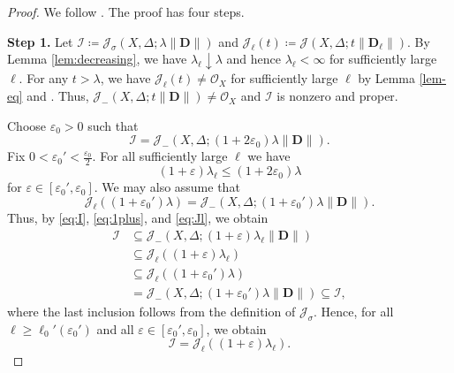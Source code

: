 \documentclass[a4paper,12pt]{amsart}
\theoremstyle{plain}
\theoremstyle{definition}
\numberwithin{equation}{section}
\newcommand{\OO}{\mathcal{O}}
\begin{document}
\begin{proof}
We follow \cite[Proof of Proposition 3.15]{CJKL}. The proof has four steps.

\noindent \textbf{Step 1.} Let $\mathcal{I}\coloneqq \mathcal{J}_{\sigma}(X,\Delta;\lambda\|\mathbf{D}\|)$ and $\mathcal{J}_{\ell}(t)\coloneqq \mathcal{J}(X,\Delta;t\|\mathbf{D}_{\ell}\|)$. By Lemma \ref{lem:decreasing}, we have $\lambda_{\ell}\downarrow \lambda$ and hence $\lambda_{\ell}<\infty$ for sufficiently large $\ell$. For any $t>\lambda$, we have $\mathcal{J}_{\ell}(t)\neq \OO_X$ for sufficiently large $\ell$ by Lemma \ref{lem-eq} and \cite[Theorem 3.7]{CJKL}. Thus, $\mathcal{J}_{-}(X,\Delta;t\|\mathbf{D}\|)\neq \OO_X$ and $\mathcal{I}$ is nonzero and proper.

Choose $\varepsilon_0>0$ such that
\begin{equation}\label{eq:I}
    \mathcal{I}=\mathcal{J}_{-}(X,\Delta;(1+2\varepsilon_0)\lambda\|\mathbf{D}\|).
\end{equation}
Fix $0<\varepsilon_0'<\frac{\varepsilon_0}{2}$. For all sufficiently large $\ell$ we have
\begin{equation}\label{eq:1plus}
    (1+\varepsilon)\lambda_{\ell}\leq (1+2\varepsilon_0)\lambda
\end{equation}
for $\varepsilon\in [\varepsilon_0',\varepsilon_0]$. 
We may also assume that
\begin{equation}\label{eq:Jl}
    \mathcal{J}_{\ell}((1+\varepsilon_0')\lambda)=\mathcal{J}_{-}(X,\Delta;(1+\varepsilon_0')\lambda\|\mathbf{D}\|).
\end{equation}
Thus, by \eqref{eq:I}, \eqref{eq:1plus}, and \eqref{eq:Jl}, we obtain
\begin{align*}
    \mathcal{I}&\subseteq \mathcal{J}_{-}(X,\Delta;(1+\varepsilon)\lambda_{\ell}\|\mathbf{D}\|)\\
    &\subseteq \mathcal{J}_{\ell}((1+\varepsilon)\lambda_{\ell})\\
    &\subseteq \mathcal{J}_{\ell}((1+\varepsilon_0')\lambda)\\
    &=\mathcal{J}_{-}(X,\Delta;(1+\varepsilon_0')\lambda\|\mathbf{D}\|)\subseteq \mathcal{I},
\end{align*}
where the last inclusion follows from the definition of $\mathcal{J}_{\sigma}$. Hence, for all $\ell\geq \ell_0'(\varepsilon_0')$ and all $\varepsilon\in [\varepsilon_0',\varepsilon_0]$, we obtain
\begin{equation}\label{eq:step1concl}
    \mathcal{I}=\mathcal{J}_{\ell}((1+\varepsilon)\lambda_{\ell}).
\end{equation}


\end{proof}
\end{document}
